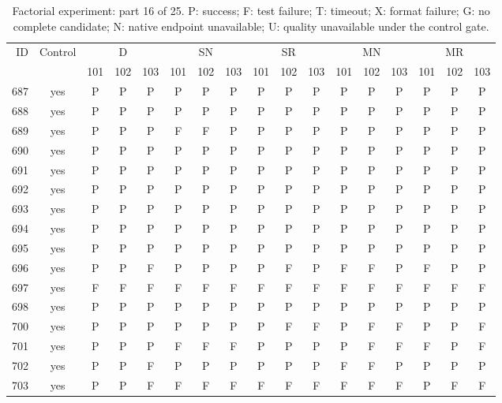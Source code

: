 \begin{table}[p]\centering\footnotesize
\setlength{\tabcolsep}{3pt}
\caption{Factorial experiment: part 16 of 25. P: success; F: test failure; T: timeout; X: format failure; G: no complete candidate; N: native endpoint unavailable; U: quality unavailable under the control gate.}
\begin{tabular*}{\textwidth}{@{\extracolsep{\fill}}rcccccccccccccccc}\toprule
ID & Control & \multicolumn{3}{c}{D} & \multicolumn{3}{c}{SN} & \multicolumn{3}{c}{SR} & \multicolumn{3}{c}{MN} & \multicolumn{3}{c}{MR}\\
\cmidrule(lr){3-5}\cmidrule(lr){6-8}\cmidrule(lr){9-11}\cmidrule(lr){12-14}\cmidrule(lr){15-17}
 & & 101 & 102 & 103 & 101 & 102 & 103 & 101 & 102 & 103 & 101 & 102 & 103 & 101 & 102 & 103\\\midrule
687 & yes & P & P & P & P & P & P & P & P & P & P & P & P & P & P & P\\
688 & yes & P & P & P & P & P & P & P & P & P & P & P & P & P & P & P\\
689 & yes & P & P & P & F & F & P & P & P & P & P & P & P & P & P & P\\
690 & yes & P & P & P & P & P & P & P & P & P & P & P & P & P & P & P\\
691 & yes & P & P & P & P & P & P & P & P & P & P & P & P & P & P & P\\
692 & yes & P & P & P & P & P & P & P & P & P & P & P & P & P & P & P\\
693 & yes & P & P & P & P & P & P & P & P & P & P & P & P & P & P & P\\
694 & yes & P & P & P & P & P & P & P & P & P & P & P & P & P & P & P\\
695 & yes & P & P & P & P & P & P & P & P & P & P & P & P & P & P & P\\
696 & yes & P & P & F & P & P & P & P & F & P & F & F & P & F & P & P\\
697 & yes & F & F & F & F & F & F & F & F & F & F & F & F & F & F & F\\
698 & yes & P & P & P & P & P & P & P & P & P & P & P & P & P & P & P\\
700 & yes & P & P & P & P & P & P & P & F & F & P & F & F & P & P & F\\
701 & yes & P & P & P & F & F & F & P & P & P & P & F & F & F & P & F\\
702 & yes & P & P & F & P & P & P & P & P & P & F & F & P & P & P & P\\
703 & yes & P & P & F & F & F & F & F & F & F & F & F & F & P & F & F\\

\end{tabular*}
\end{table}
